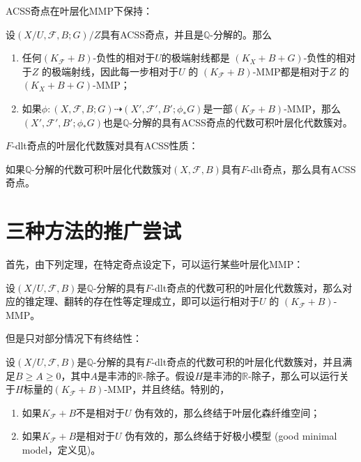 ACSS奇点在叶层化MMP下保持：
\begin{proposition}\cite[Lemma 4.8]{acc_foliation}\label{acssmmp}
 设$(X/U,\mathcal{F},B;G)/Z$具有ACSS奇点，并且是$\mathbb{Q}$-分解的。那么 
 \begin{enumerate}
   \item 任何$(K_{\mathcal{F}}+B)$-负性的相对于$U$的极端射线都是 $(K_{X}+B+G)$-负性的相对于$Z$ 的极端射线，因此每一步相对于$U$ 的 $(K_{\mathcal{F}}+B)$-MMP都是相对于$Z$ 的$(K_{X}+B+G)$-MMP；
   \item 如果$\phi:(X,\mathcal{F},B;G) \dashrightarrow (X',\mathcal{F}',B';\phi_{*}G)$是一部$(K_{\mathcal{F}}+B)$-MMP，那么$(X',\mathcal{F}',B';\phi_{*}G)$也是$\mathbb{Q}$-分解的具有ACSS奇点的代数可积叶层化代数簇对。
 \end{enumerate}
\end{proposition}
$F$-dlt奇点的叶层化代数簇对具有ACSS性质：
\begin{theorem}\cite[Theorem 17.0.1]{chlx}
 如果$\mathbb{Q}$-分解的代数可积叶层化代数簇对$(X,\mathcal{F},B)$具有$F$-dlt奇点，那么具有ACSS奇点。  
\end{theorem}

\section{三种方法的推广尝试}
首先，由下列定理，在特定奇点设定下，可以运行某些叶层化MMP：
\begin{theorem}[叶层化MMP]\cite[Theorem 2.1.1]{chlx}
设$(X/U,\mathcal{F},B)$是$\mathbb{Q}$-分解的具有$F$-dlt奇点的代数可积的叶层化代数簇对，那么对应的锥定理、翻转的存在性等定理成立，即可以运行相对于$U$ 的 $(K_{\mathcal{F}}+B)$-MMP。  
\end{theorem}
但是只对部分情况下有终结性：
\begin{theorem}[叶层化MMP终结性]\cite[Theorem 2.1.2]{chlx}
设$(X/U,\mathcal{F},B)$是$\mathbb{Q}$-分解的具有$F$-dlt奇点的代数可积的叶层化代数簇对，并且满足$B\geqslant A \geqslant 0$，其中$A$是丰沛的$\mathbb{R}$-除子。假设$H$是丰沛的$\mathbb{R}$-除子，那么可以运行关于$H$标量的$(K_{\mathcal{F}}+B)$-MMP，并且终结。特别的，
\begin{enumerate}
  \item 如果$K_{\mathcal{F}}+B$不是相对于$U$ 伪有效的，那么终结于叶层化森纤维空间；
  \item 如果$K_{\mathcal{F}}+B$是相对于$U$ 伪有效的，那么终结于好极小模型 (good minimal model，定义见\cite[Definition 9.1.1]{chlx})。
\end{enumerate}
\end{theorem}

